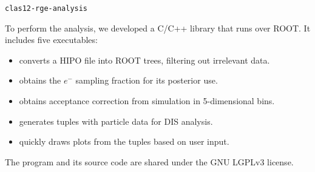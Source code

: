\begin{frame}{\texttt{clas12-rge-analysis}}
    \label{11.11::clas12-rge-analysis}

    To perform the analysis, we developed a C/C++ library that runs over ROOT.
    It includes five executables:

    \vspace{12pt}

    \begin{itemize}
        \item
             converts a HIPO file into ROOT trees, filtering out irrelevant data.

        \vspace{3pt}
        \item
             obtains the $e^-$ sampling fraction for its posterior use.

        \vspace{3pt}
        \item
             obtains acceptance correction from simulation in 5-dimensional bins.

        \vspace{3pt}
        \item
             generates tuples with particle data for DIS analysis.

        \vspace{3pt}
        \item
             quickly draws plots from the tuples based on user input.
    \end{itemize}

    \vspace{24pt}

    The program and its source code are shared under the GNU LGPLv3 license.
\end{frame}
